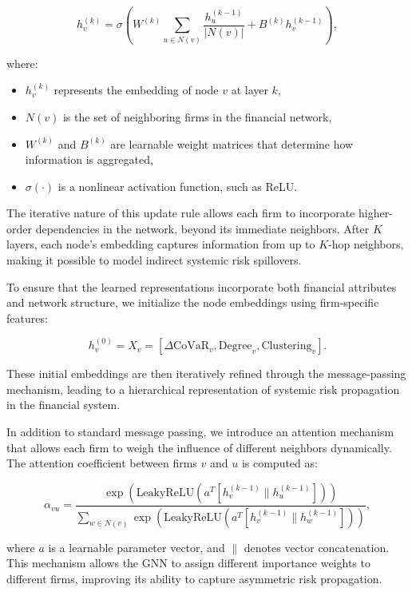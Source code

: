 \documentclass[preprint,12pt,authoryear]{elsarticle}
\begin{document}
\[
h_v^{(k)} = \sigma \left( W^{(k)} \sum_{u \in N(v)} \frac{h_u^{(k-1)}}{|N(v)|} + B^{(k)} h_v^{(k-1)} \right),
\]

where:
\begin{itemize}
    \item \( h_v^{(k)} \) represents the embedding of node \( v \) at layer \( k \),
    \item \( N(v) \) is the set of neighboring firms in the financial network,
    \item \( W^{(k)} \) and \( B^{(k)} \) are learnable weight matrices that determine how information is aggregated,
    \item \( \sigma(\cdot) \) is a nonlinear activation function, such as ReLU.
\end{itemize}

The iterative nature of this update rule allows each firm to incorporate higher-order dependencies in the network, beyond its immediate neighbors. After \( K \) layers, each node's embedding captures information from up to \( K \)-hop neighbors, making it possible to model indirect systemic risk spillovers.

To ensure that the learned representations incorporate both financial attributes and network structure, we initialize the node embeddings using firm-specific features:

\[
h_v^{(0)} = X_v = \left[ \Delta \text{CoVaR}_v, \text{Degree}_v, \text{Clustering}_v \right].
\]

These initial embeddings are then iteratively refined through the message-passing mechanism, leading to a hierarchical representation of systemic risk propagation in the financial system.

In addition to standard message passing, we introduce an attention mechanism that allows each firm to weigh the influence of different neighbors dynamically. The attention coefficient between firms \( v \) and \( u \) is computed as:

\[
\alpha_{vu} = \frac{\exp \left( \text{LeakyReLU} \left( a^T [h_v^{(k-1)} \parallel h_u^{(k-1)}] \right) \right)}{\sum_{w \in N(v)} \exp \left( \text{LeakyReLU} \left( a^T [h_v^{(k-1)} \parallel h_w^{(k-1)}] \right) \right)},
\]

where \( a \) is a learnable parameter vector, and \( \parallel \) denotes vector concatenation. This mechanism allows the GNN to assign different importance weights to different firms, improving its ability to capture asymmetric risk propagation.
\end{document}
